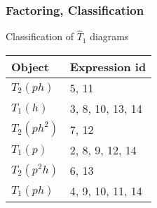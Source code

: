 \begin{frame}
    \frametitle{Factoring, Classification}

\begin{block}{Classification of $\hat{T}_1$ diagrams}
\begin{tabular}{|l||l|}
    \hline
    Object & Expression id \\
    \hline
    $T_2(ph)$ & 5, 11\\
    \hline
    $T_1(h)$ & 3, 8, 10, 13, 14\\
    \hline
    $T_2(ph^2)$ & 7, 12\\
    \hline
    $T_1(p)$ & 2, 8, 9, 12, 14 \\
    \hline
    $T_2(p^2h)$ & 6, 13\\
    \hline
    $T_1(ph)$ & 4, 9, 10, 11, 14\\
    \hline
\end{tabular}

\end{block}
\end{frame}


